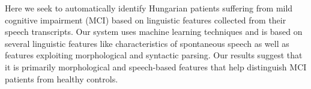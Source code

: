 Here we seek to automatically identify Hungarian patients suffering from mild cognitive impairment (MCI) based on linguistic features collected from their speech transcripts. Our system uses machine learning techniques and is based on several linguistic features like characteristics of spontaneous speech as well as features exploiting morphological and syntactic parsing. Our results suggest that it is primarily morphological and speech-based features that help distinguish MCI patients from healthy controls.
